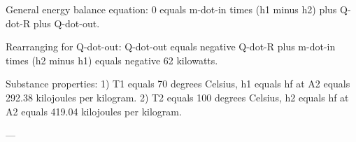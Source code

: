 General energy balance equation:  
0 equals m-dot-in times (h1 minus h2) plus Q-dot-R plus Q-dot-out.  

Rearranging for Q-dot-out:  
Q-dot-out equals negative Q-dot-R plus m-dot-in times (h2 minus h1) equals negative 62 kilowatts.  

Substance properties:  
1) T1 equals 70 degrees Celsius, h1 equals hf at A2 equals 292.38 kilojoules per kilogram.  
2) T2 equals 100 degrees Celsius, h2 equals hf at A2 equals 419.04 kilojoules per kilogram.  

---